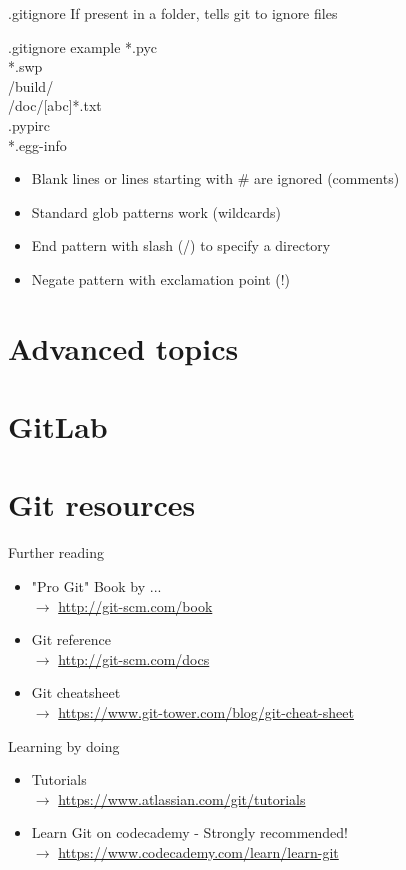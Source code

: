 \documentclass[10pt,xcolor=dvipsnames]{beamer}
\begin{document}
\begin{frame}{.gitignore}
If present in a folder, tells git to ignore files
\begin{block}{.gitignore example}
*.pyc\\
*.swp\\
/build/\\
/doc/[abc]*.txt\\
.pypirc\\
*.egg-info\\
\end{block}
\begin{itemize}
\item Blank lines or lines starting with \# are ignored (comments)
\item Standard glob patterns work (wildcards)
\item End pattern with slash (/) to specify a directory
\item Negate pattern with exclamation point (!) 
\end{itemize}
\end{frame}


\section{Advanced topics}

\section{GitLab}

\section{Git resources}
\begin{frame}{Further reading}
\begin{itemize}
  \setlength\itemsep{0.4in}
\item "Pro Git" Book by ... \\$\rightarrow$  \url{http://git-scm.com/book}
\item Git reference  \\ $\rightarrow$  \url{http://git-scm.com/docs}
\item Git cheatsheet  \\ $\rightarrow$ \url{https://www.git-tower.com/blog/git-cheat-sheet}
\end{itemize}
\end{frame}

\begin{frame}{Learning by doing}
\begin{itemize}
  \setlength\itemsep{0.4in}
\item Tutorials  \\$\rightarrow$  \url{https://www.atlassian.com/git/tutorials}
\item Learn Git on codecademy - Strongly recommended!\\ $\rightarrow$ \url{https://www.codecademy.com/learn/learn-git}
\end{itemize}
\end{frame}
\end{document}

